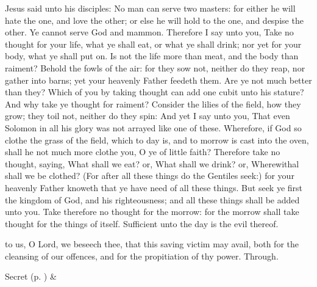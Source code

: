 
 Jesus said unto his disciples: No man can serve two masters: for either he will hate the one, and love the other; or else he will hold to the one, and despise the other. Ye cannot serve God and mammon. Therefore I say unto you, Take no thought for your life, what ye shall eat, or what ye shall drink; nor yet for your body, what ye shall put on. Is not the life more than meat, and the body than raiment? Behold the fowls of the air: for they sow not, neither do they reap, nor gather into barns; yet your heavenly Father feedeth them. Are ye not much better than they? Which of you by taking thought can add one cubit unto his stature? And why take ye thought for raiment? Consider the lilies of the field, how they grow; they toil not, neither do they spin: And yet I say unto you, That even Solomon in all his glory was not arrayed like one of these. Wherefore, if God so clothe the grass of the field, which to day is, and to morrow is cast into the oven, shall he not much more clothe you, O ye of little faith? Therefore take no thought, saying, What shall we eat? or, What shall we drink? or, Wherewithal shall we be clothed? (For after all these things do the Gentiles seek:) for your heavenly Father knoweth that ye have need of all these things. But seek ye first the kingdom of God, and his righteousness; and all these things shall be added unto you. Take therefore no thought for the morrow: for the morrow shall take thought for the things of itself. Sufficient unto the day is the evil thereof.


\vspace{-0.25\baselineskip}

\secret

\vspace{-0.1\baselineskip}

 to us, O Lord, we beseech thee, that this saving victim may avail, both for the cleansing of our offences, and for the propitiation of thy power. Through.
\begin{rubric}
     Secret  (p. \pageref{SPSaints}) \&  
\end{rubric}

